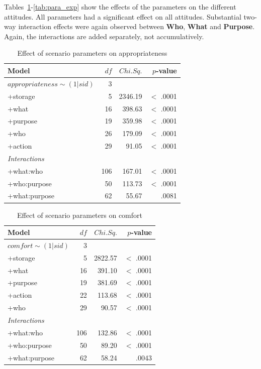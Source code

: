 Tables~\ref{tab:para_approp}-\ref{tab:para_exp} show the effects of the parameters on the different attitudes. All parameters had a significant effect on all attitudes. Substantial two-way interaction effects were again observed between \textbf{Who}, \textbf{What} and \textbf{Purpose}. Again, the interactions are added separately, not accumulatively.

\begin{table}
	\centering
	\caption{Effect of scenario parameters on appropriateness}
	\label{tab:para_approp}
	\begin{tabular}{ l | r | r | r }
		\hline
		Model &	$df$ & $Chi. Sq.$ & $p$-value 	\\ \hline
		$appropriateness\sim(1 | sid)$ &	3	  	&	    &				\\
		+storage &					5	& 	  2346.19 & 		$<$ .0001 	\\
		+what &					16 &		  398.63 &		$<$ .0001 	\\
		+purpose &				19 & 	  359.98 & 		  	$<$ .0001	\\
		+who &			26 &		  179.09 & 		$<$ .0001 	\\
		+action &			29 &		  91.05& 		$<$ .0001\\\hline
		\emph{Interactions}&			 &		  & \\\hline
		+what:who &			106 &		  167.01 & 		$<$ .0001\\
		+who:purpose &			50 &		  113.73 & 		$<$ .0001\\
		+what:purpose &			62 &		  55.67 & 		.0081\\
		\hline
	\end{tabular}
\end{table}

\begin{table}
	\centering
	\caption{Effect of scenario parameters on comfort}
	\label{tab:para_comfort}
	\begin{tabular}{ l | r | r | r }
		\hline
		Model &	$df$ & $Chi. Sq.$ & $p$-value 	\\ \hline
		$comfort\sim(1 | sid)$ &	3	  	&	    &				\\
		+storage &					5	& 	  2822.57 & 		$<$ .0001 	\\
		+what &					16 &		  391.10 &		$<$ .0001 	\\
		+purpose &				19 & 	  381.69 & 		  	$<$ .0001	\\
		+action &			22 &		  113.68 & 		$<$ .0001 	\\
		+who &			29 &		  90.57& 		$<$ .0001\\\hline
		\emph{Interactions}&			 &		  & \\\hline
		+what:who &			106 &		  132.86 & 		$<$ .0001\\
		+who:purpose &			50 &		  89.20 & 		$<$ .0001\\
		+what:purpose &			62 &		  58.24 & 		 .0043\\
		\hline
	\end{tabular}
\end{table}

